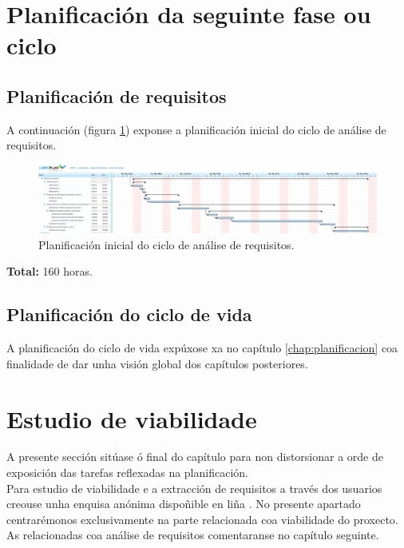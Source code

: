 \section{Planificación da seguinte fase ou ciclo}

 \subsection{Planificación de requisitos}

 A continuación (figura \ref{figura:PlanificacionInicialRequisitos}) exponse a
 planificación inicial do ciclo de análise de requisitos. \\

 \begin{figure}[htbp]
 \centering
 \includegraphics[trim=0 0 48cm 0,clip=true,scale=0.7,keepaspectratio=true]{./imagenes/requisitos.png}
 \caption{Planificación inicial do ciclo de análise de requisitos.}
 \label{figura:PlanificacionInicialRequisitos}
\end{figure}

\textbf{Total:} 160 horas.

 \subsection{Planificación do ciclo de vida}

 A planificación do ciclo de vida expúxose xa no capítulo
 \ref{chap:planificacion} coa finalidade de dar unha visión global dos
 capítulos posteriores.

\section{Estudio de viabilidade}

A presente sección sitúase ó final do capítulo para non distorsionar a orde de
exposición das tarefas reflexadas na planificación.\\

Para estudio de viabilidade e a extracción de requisitos a través dos usuarios
creouse unha enquisa anónima dispoñible en liña \cite{Enquisa}. No presente
apartado centrarémonos exclusivamente na parte relacionada coa viabilidade do
proxecto. As relacionadas coa análise de requisitos comentaranse no capítulo
seguinte.\\

